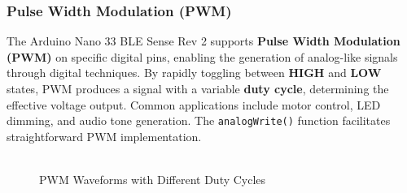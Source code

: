 \subsubsection{Pulse Width Modulation (PWM)}

The Arduino Nano 33 BLE Sense Rev 2 supports \textbf{Pulse Width Modulation (PWM)} on specific digital pins, enabling the generation of analog-like signals through digital techniques. By rapidly toggling between \textbf{HIGH} and \textbf{LOW} states, PWM produces a signal with a variable \textbf{duty cycle}, determining the effective voltage output. Common applications include motor control, LED dimming, and audio tone generation. The \texttt{analogWrite()} function facilitates straightforward PWM implementation. 
\\ \\
\vspace{1em} %
\begin{figure}[h!]
	\centering
	\caption{PWM Waveforms with Different Duty Cycles}
	\label{fig:pwm_waveforms}
\end{figure}

